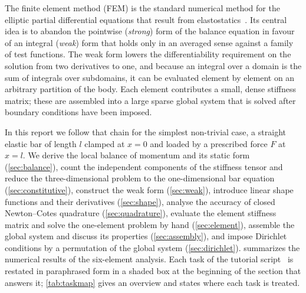 \documentclass[11pt,a4paper]{article}
\numberwithin{equation}{section}
\theoremstyle{remark}
\begin{document}
The finite element method (FEM) is the standard numerical method for the elliptic partial
differential equations that result from elastostatics~\citep{zienkiewicz2013, hughes2000}.
Its central idea is to abandon the pointwise (\emph{strong}) form of the balance equation
in favour of an integral (\emph{weak}) form that holds only in an averaged sense against a
family of test functions. The weak form lowers the differentiability requirement on the
solution from two derivatives to one, and because an integral over a domain is the sum of
integrals over subdomains, it can be evaluated element by element on an arbitrary
partition of the body. Each element contributes a small, dense stiffness matrix; these are
assembled into a large sparse global system that is solved after boundary conditions have
been imposed.

In this report we follow that chain for the simplest non-trivial case, a straight elastic
bar of length $l$ clamped at $x = 0$ and loaded by a prescribed force $F$ at $x = l$. We
derive the local balance of momentum and its static form (\cref{sec:balance}), count the
independent components of the stiffness tensor and reduce the three-dimensional problem
to the one-dimensional bar equation (\cref{sec:constitutive}), construct the weak form
(\cref{sec:weak}), introduce linear shape functions and their derivatives
(\cref{sec:shape}), analyse the accuracy of closed Newton--Cotes quadrature
(\cref{sec:quadrature}), evaluate the element stiffness matrix and solve the one-element
problem by hand (\cref{sec:element}), assemble the global system and discuss its
properties (\cref{sec:assembly}), and impose Dirichlet conditions by a permutation of the
global system (\cref{sec:dirichlet}).  summarizes the numerical results
of the six-element analysis. Each task of the tutorial script~\citep{script} is restated
in paraphrased form in a shaded box at the beginning of the section that answers it;
\cref{tab:taskmap} gives an overview and states where each task is treated.
\end{document}
